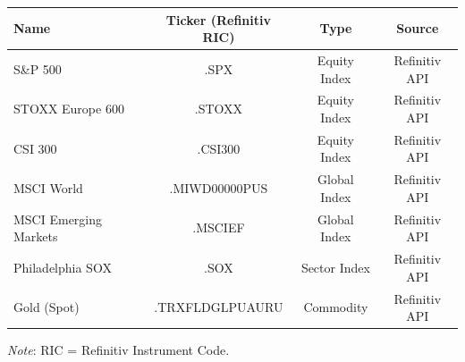 \begin{tabular}{lccc}
  \toprule
  \textbf{Name} & \textbf{Ticker (Refinitiv RIC)} & \textbf{Type} & \textbf{Source} \\ 
  \midrule
  S\&P 500 & .SPX & Equity Index & Refinitiv API \cite{LSEGRefinitivAPI2025} \\ 
  STOXX Europe 600 & .STOXX & Equity Index & Refinitiv API \cite{LSEGRefinitivAPI2025} \\ 
  CSI 300 & .CSI300 & Equity Index & Refinitiv API \cite{LSEGRefinitivAPI2025} \\ 
  MSCI World & .MIWD00000PUS & Global Index & Refinitiv API \cite{LSEGRefinitivAPI2025} \\ 
  MSCI Emerging Markets & .MSCIEF & Global Index & Refinitiv API \cite{LSEGRefinitivAPI2025} \\ 
  Philadelphia SOX & .SOX & Sector Index & Refinitiv API \cite{LSEGRefinitivAPI2025} \\ 
  Gold (Spot) & .TRXFLDGLPUAURU & Commodity & Refinitiv API \cite{LSEGRefinitivAPI2025} \\ 
  \bottomrule
\end{tabular}
\par\vspace{4pt}
\begin{minipage}{\linewidth}
  \footnotesize \textit{Note}: RIC = Refinitiv Instrument Code.
\end{minipage}